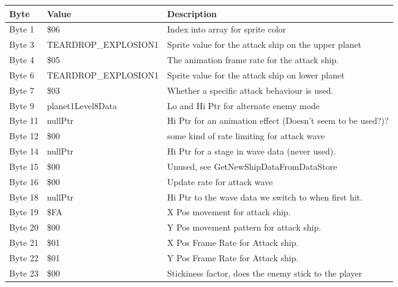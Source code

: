 \begin{figure}[H]
{\begin{adjustbox}{width=12cm}
\begin{tabular}{lll}
\toprule
 Byte    & Value               & Description                                                        \\
\midrule
 Byte 1  & \$06                 & Index into array for sprite color                                  \\
 Byte 3  & TEARDROP\_EXPLOSION1 & Sprite value for the attack ship on the upper planet               \\
 Byte 4  & \$05                 & The animation frame rate for the attack ship.                      \\
 Byte 6  & TEARDROP\_EXPLOSION1 & Sprite value for the attack ship on lower planet                   \\
 Byte 7  & \$03                 & Whether a specific attack behaviour is used.                       \\
 Byte 9  & planet1Level8Data   & Lo and Hi Ptr for alternate enemy mode                             \\
 Byte 11 & nullPtr             & Hi Ptr for an animation effect (Doesn't seem to be used?)?         \\
 Byte 12 & \$00                 & some kind of rate limiting for attack wave                         \\
 Byte 14 & nullPtr             & Hi Ptr for a stage in wave data (never used).                      \\
 Byte 15 & \$00                 & Unused, see GetNewShipDataFromDataStore                            \\
 Byte 16 & \$00                 & Update rate for attack wave                                        \\
 Byte 18 & nullPtr             & Hi Ptr to the wave data we switch to when first hit.               \\
 Byte 19 & \$FA                 & X Pos movement for attack ship.                                    \\
 Byte 20 & \$00                 & Y Pos movement pattern for attack ship.                            \\
 Byte 21 & \$01                 & X Pos Frame Rate for Attack ship.                                  \\
 Byte 22 & \$01                 & Y Pos Frame Rate for Attack ship.                                  \\
 Byte 23 & \$00                 & Stickiness factor, does the enemy stick to the player              \\

\end{tabular}
\end{adjustbox}}
\end{figure}
